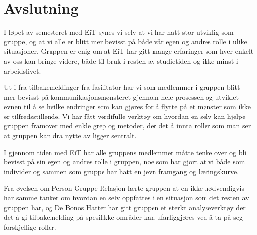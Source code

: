 \section{Avslutning}

I løpet av semesteret med EiT synes vi selv at vi har hatt stor utviklig
som gruppe, og at vi alle er blitt mer bevisst på både vår egen og
andres rolle i ulike situasjoner. Gruppen er enig om at EiT har gitt
mange erfaringer som hver enkelt av oss kan bringe videre, både til bruk
i resten av studietiden og ikke minst i arbeidslivet. 


Ut i fra tilbakemeldinger fra fasilitator har vi som medlemmer i gruppen
blitt mer bevisst på kommunikasjonsmønsteret gjennom hele prosessen og
utviklet evnen til å se hvilke endringer som kan gjøres for å flytte på
et mønster som ikke er tilfredsstillende. Vi har fått verdifulle verktøy
om hvordan en selv kan hjelpe gruppen framover med enkle grep og
metoder, der det å innta roller som man ser at gruppen kan dra nytte av
ligger sentralt.

I gjennom tiden med EiT har alle gruppens medlemmer måtte tenke over og bli bevisst på sin egen og andres rolle
i gruppen, noe som har gjort at vi både som individer og sammen som gruppe har hatt en jevn framgang og læringskurve.

Fra øvelsen om Person-Gruppe Relasjon lærte gruppen at en ikke nødvendigvis har samme tanker om hvordan en selv
oppfattes i en situasjon som det resten av gruppen har, og De Bonos Hatter har gitt gruppen et sterkt analyseverktøy 
der det å gi tilbakemelding på spesifikke
områder kan ufarliggjøres ved å ta på seg forskjellige roller. 

